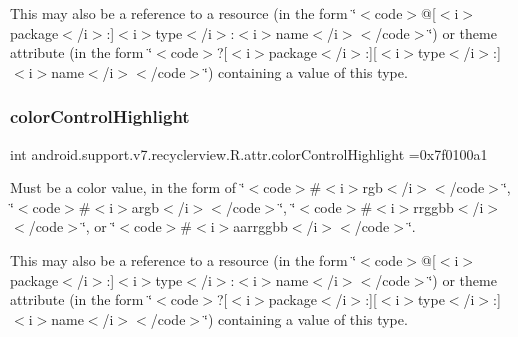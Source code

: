 This may also be a reference to a resource (in the form \char`\"{}$<$code$>$@\mbox{[}$<$i$>$package$<$/i$>$\+:\mbox{]}$<$i$>$type$<$/i$>$\+:$<$i$>$name$<$/i$>$$<$/code$>$\char`\"{}) or theme attribute (in the form \char`\"{}$<$code$>$?\mbox{[}$<$i$>$package$<$/i$>$\+:\mbox{]}\mbox{[}$<$i$>$type$<$/i$>$\+:\mbox{]}$<$i$>$name$<$/i$>$$<$/code$>$\char`\"{}) containing a value of this type. \mbox{\label{classandroid_1_1support_1_1v7_1_1recyclerview_1_1R_1_1attr_abfbf02cd9adb806ed47a4d0a8b78ab54}} 
\subsubsection{\texorpdfstring{color\+Control\+Highlight}{colorControlHighlight}}
{\footnotesize\ttfamily int android.\+support.\+v7.\+recyclerview.\+R.\+attr.\+color\+Control\+Highlight =0x7f0100a1\hspace{0.3cm}{\ttfamily [static]}}

Must be a color value, in the form of \char`\"{}$<$code$>$\#$<$i$>$rgb$<$/i$>$$<$/code$>$\char`\"{}, \char`\"{}$<$code$>$\#$<$i$>$argb$<$/i$>$$<$/code$>$\char`\"{}, \char`\"{}$<$code$>$\#$<$i$>$rrggbb$<$/i$>$$<$/code$>$\char`\"{}, or \char`\"{}$<$code$>$\#$<$i$>$aarrggbb$<$/i$>$$<$/code$>$\char`\"{}. 

This may also be a reference to a resource (in the form \char`\"{}$<$code$>$@\mbox{[}$<$i$>$package$<$/i$>$\+:\mbox{]}$<$i$>$type$<$/i$>$\+:$<$i$>$name$<$/i$>$$<$/code$>$\char`\"{}) or theme attribute (in the form \char`\"{}$<$code$>$?\mbox{[}$<$i$>$package$<$/i$>$\+:\mbox{]}\mbox{[}$<$i$>$type$<$/i$>$\+:\mbox{]}$<$i$>$name$<$/i$>$$<$/code$>$\char`\"{}) containing a value of this type. \mbox{\label{classandroid_1_1support_1_1v7_1_1recyclerview_1_1R_1_1attr_add6b98d7c055e7c1e5efbed4fc5bb5b5}} 
